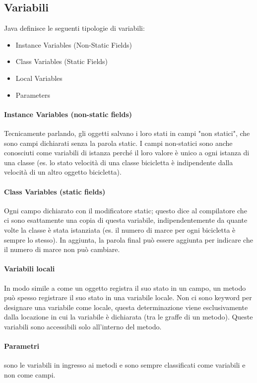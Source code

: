 \documentclass[a4paper,12pt,twoside]{book}
\begin{document}
\subsection{Variabili}

Java definisce le seguenti tipologie di variabili:
\begin{itemize}
\item Instance Variables (Non-Static Fields)
\item Class Variables (Static Fields)
\item Local Variables
\item Parameters
\end{itemize}

\paragraph{Instance Variables (non-static fields)} Tecnicamente
parlando, gli oggetti salvano i loro stati in campi "non statici", che
sono campi dichiarati senza la parola static. I campi non-statici sono
anche conosciuti come variabili di istanza perché il loro valore è
unico a ogni istanza di una classe (es. lo stato velocità di una
classe bicicletta è indipendente dalla velocità di un altro oggetto
bicicletta).

\paragraph{Class Variables (static fields)} Ogni campo dichiarato
con il modificatore static; questo dice al compilatore che ci sono
esattamente una copia di questa variabile, indipendentemente da quante
volte la classe è stata istanziata (es. il numero di marce per ogni
bicicletta è sempre lo stesso). In aggiunta, la parola final può
essere aggiunta per indicare che il numero di marce non può cambiare.

\paragraph{Variabili locali} In modo simile a come un oggetto registra
il suo stato in un campo, un metodo può spesso registrare il suo stato
in una variabile locale. Non ci sono keyword per designare una
variabile come locale, questa determinazione viene esclusivamente
dalla locazione in cui la variabile è dichiarata (tra le graffe di un
metodo). Queste variabili sono accessibili solo all'interno del
metodo.

\paragraph{Parametri} sono le variabili in ingresso ai metodi e sono
sempre classificati come variabili e non come campi.
\end{document}

